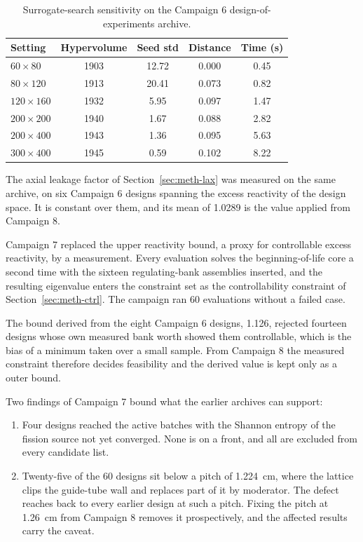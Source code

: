 \begin{table}[htbp]
  \centering
  \caption{Surrogate-search sensitivity on the Campaign 6 design-of-experiments archive.}
  \label{tab:nsga-sens}
  \begin{tabular}{lcccc}
    \toprule
    Setting & Hypervolume & Seed std & Distance & Time (s) \\
    \midrule
    $60\times80$   & 1903 & 12.72 & 0.000 & 0.45 \\
    $80\times120$  & 1913 & 20.41 & 0.073 & 0.82 \\
    $120\times160$ & 1932 &  5.95 & 0.097 & 1.47 \\
    $200\times200$ & 1940 &  1.67 & 0.088 & 2.82 \\
    $200\times400$ & 1943 &  1.36 & 0.095 & 5.63 \\
    $300\times400$ & 1945 &  0.59 & 0.102 & 8.22 \\
    \bottomrule
  \end{tabular}
\end{table}

The axial leakage factor of Section~\ref{sec:meth-lax} was measured on
the same archive, on six Campaign 6 designs spanning the excess
reactivity of the design space. It is constant over them, and its mean
of \num{1.0289} is the value applied from Campaign 8.

Campaign 7 replaced the upper reactivity bound, a proxy for controllable excess
reactivity, by a measurement. Every evaluation solves the beginning-of-life
core a second time with the sixteen regulating-bank assemblies inserted, and
the resulting eigenvalue enters the constraint set as the controllability
constraint of Section~\ref{sec:meth-ctrl}. The campaign ran 60 evaluations
without a failed case.

The bound derived from the eight Campaign 6 designs, 1.126, rejected
fourteen designs whose own measured bank worth showed them
controllable, which is the bias of a minimum taken over a small sample.
From Campaign 8 the measured constraint therefore decides feasibility and
the derived value is kept only as a outer bound.

Two findings of Campaign 7 bound what the earlier archives can support:

\begin{enumerate}
  \item Four designs reached the active batches with the Shannon entropy of
        the fission source not yet converged. None is on a front, and all are
        excluded from every candidate list.

  \item Twenty-five of the 60 designs sit below a pitch of \SI{1.224}{cm},
        where the lattice clips the guide-tube wall and replaces part of it
        by moderator. The defect reaches back to every earlier design at such
        a pitch. Fixing the pitch at \SI{1.26}{cm} from Campaign 8 removes it
        prospectively, and the affected results carry the caveat.
\end{enumerate}

